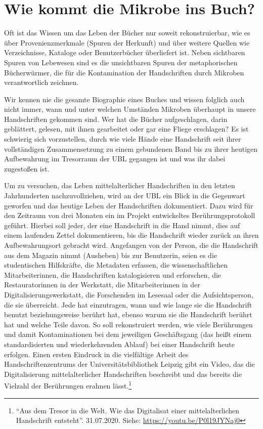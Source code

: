 \documentclass[a4paper,
fontsize=11pt,
oneside,
numbers=noperiodatend,
parskip=half-,
bibliography=totoc,
final
]{scrartcl}
\begin{document}
\hypertarget{wie-kommt-die-mikrobe-ins-buch}{%
\section{Wie kommt die Mikrobe ins
Buch?}\label{wie-kommt-die-mikrobe-ins-buch}}

Oft ist das Wissen um das Leben der Bücher nur soweit rekonstruierbar,
wie es über Provenienzmerkmale (Spuren der Herkunft) und über weitere
Quellen wie Verzeichnisse, Kataloge oder Benutzerbücher überliefert ist.
Neben sichtbaren Spuren von Lebewesen sind es die unsichtbaren Spuren
der metaphorischen Bücherwürmer, die für die Kontamination der
Handschriften durch Mikroben verantwortlich zeichnen.

Wir kennen nie die gesamte Biographie eines Buches und wissen folglich
auch nicht immer, wann und unter welchen Umständen Mikroben überhaupt in
unsere Handschriften gekommen sind. Wer hat die Bücher aufgeschlagen,
darin geblättert, gelesen, mit ihnen gearbeitet oder gar eine Fliege
erschlagen? Es ist schwierig sich vorzustellen, durch wie viele Hände
eine Handschrift seit ihrer vollständigen Zusammensetzung zu einem
gebundenen Band bis zu ihrer heutigen Aufbewahrung im Tresorraum der UBL
gegangen ist und was ihr dabei zugestoßen ist.

Um zu versuchen, das Leben mittelalterlicher Handschriften in den
letzten Jahrhunderten nachzuvollziehen, wird an der UBL ein Blick in die
Gegenwart geworfen und das heutige Leben der Handschriften dokumentiert.
Dazu wird für den Zeitraum von drei Monaten ein im Projekt entwickeltes
Berührungsprotokoll geführt. Hierbei soll jeder, der eine Handschrift in
die Hand nimmt, dies auf einem laufenden Zettel dokumentieren, bis die
Handschrift wieder zurück an ihren Aufbewahrungsort gebracht wird.
Angefangen von der Person, die die Handschrift aus dem Magazin nimmt
(Ausheben) bis zur Benutzerin, seien es die studentischen Hilfskräfte,
die Metadaten erfassen, die wissenschaftlichen Mitarbeiterinnen, die
Handschriften katalogisieren und erforschen, die Restauratorinnen in der
Werkstatt, die Mitarbeiterinnen in der Digitalisierungswerkstatt, die
Forschenden im Lesesaal oder die Aufsichtsperson, die sie überreicht.
Jede hat einzutragen, wann und wie lange sie die Handschrift benutzt
beziehungsweise berührt hat, ebenso warum sie die Handschrift berührt
hat und welche Teile davon. So soll rekonstruiert werden, wie viele
Berührungen und damit Kontaminationen bei dem jeweiligen Geschäftsgang
(das heißt einem standardisierten und wiederkehrenden Ablauf) bei einer
Handschrift heute erfolgen. Einen ersten Eindruck in die vielfältige
Arbeit des Handschriftenzentrums der Universitätsbibliothek Leipzig gibt
ein Video, das die Digitalisierung mittelalterlicher Handschriften
beschreibt und das bereits die Vielzahl der Berührungen erahnen
lässt.\footnote{\enquote{Aus dem Tresor in die Welt. Wie das Digitalisat
  einer mittelalterlichen Handschrift entsteht}. 31.07.2020. Siehe:
  \url{https://youtu.be/P0l19JYNaj0}}
\end{document}
